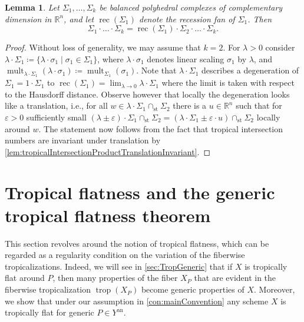 \documentclass[12pt,reqno,a4paper]{amsart}
\theoremstyle{theoremstyle}
\newtheorem{lemma}[theorem]{Lemma}
\theoremstyle{examplestyle}
\theoremstyle{algorithmstyle}
\newcommand{\RR}{\mathbb{R}}
\newcommand{\an}{{\mathrm{an}}}
\newcommand{\st}{{\mathrm{st}}}
\DeclareMathOperator{\mult}{mult}
\DeclareMathOperator{\rec}{rec}
\DeclareMathOperator{\trop}{trop}
\begin{document}
\begin{lemma}
  \label{lem:tropicalIntersectionNumberRecessionFan}
  Let $\Sigma_1,\dots,\Sigma_k$ be balanced polyhedral complexes of complementary dimension in $\RR^n$, and let $\rec(\Sigma_1)$ denote the recession fan of $\Sigma_1$.  Then
  \begin{equation*}
    \Sigma_1\cdot\ldots\cdot\Sigma_k = \rec(\Sigma_1)\cdot\Sigma_2\cdot\ldots\cdot\Sigma_k.
  \end{equation*}
\end{lemma}
\begin{proof}
  Without loss of generality, we may assume that $k=2$.  For $\lambda>0$ consider $\lambda\cdot\Sigma_1\coloneqq\{\lambda\cdot\sigma_1\mid\sigma_1\in\Sigma_1\}$, where $\lambda\cdot\sigma_1$ denotes linear scaling $\sigma_1$ by $\lambda$, and $\mult_{\lambda\cdot\Sigma_1}(\lambda\cdot\sigma_1)\coloneqq \mult_{\Sigma_1}(\sigma_1)$.  Note that $\lambda\cdot\Sigma_1$ describes a degeneration of $\Sigma_1=1\cdot\Sigma_1$ to $\rec(\Sigma_1)=\lim_{\lambda\to 0}\lambda\cdot\Sigma_1$ where the limit is taken with respect to the Hausdorff distance.  Observe however that locally the degeneration looks like a translation, i.e., for all $w\in \lambda\cdot\Sigma_1\cap_\st\Sigma_2$ there is a $u\in\RR^n$ such that for $\varepsilon>0$ sufficiently small $(\lambda\pm\varepsilon)\cdot\Sigma_1\cap_\st\Sigma_2=(\lambda\cdot\Sigma_1\pm\varepsilon\cdot u)\cap_\st\Sigma_2$ locally around $w$. The statement now follows from the fact that tropical intersection numbers are invariant under translation by \cref{lem:tropicalIntersectionProductTranslationInvariant}.
\end{proof}

%
%
%
%
 
%
\section{Tropical flatness and the generic tropical flatness theorem}\label{sec:FiberwiseTropicalizations}
This section revolves around the notion of tropical flatness, which can be regarded as a regularity condition on the variation of the fiberwise tropicalizations. Indeed, we will see in \cref{sec:TropGeneric} that if $X$ is tropically flat around $P$, then many properties of the fiber $X_P$ that are evident in the fiberwise tropicalization $\trop (X_{P})$ become generic properties of $X$.
Moreover, we show that under our assumption in \cref{con:mainConvention} any scheme $X$ is tropically flat for generic $P\in Y^{\an}$.
\end{document}
